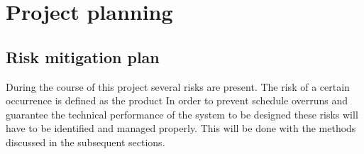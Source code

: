 \section{Project planning}\label{cha:plan}

\subsection{Risk mitigation plan}
\label{sec:riskmit}
During the course of this project several risks are present. The risk of a certain occurrence is defined as the product  In order to prevent schedule overruns and guarantee the technical performance of the system to be designed these risks will have to be identified and managed properly. This will be done with the methods discussed in the subsequent sections.


